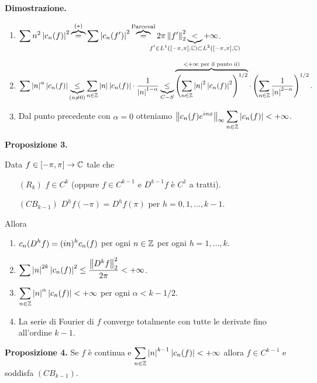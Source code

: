 \textbf{Dimostrazione.}
\begin{enumerate}

\item $\ds \sum n^2 \left| c_n(f) \right|^2 \overbrace{=}^{(\ast)} \sum \left| c_n(f') \right|^2
\overbrace{=}^{\text{Parceval} } 2\pi \norm{f'}_2^2 \underbrace{<}_{\mathclap{f' \in L^1([-\pi,\pi], \C) \subset L^2([-\pi,\pi], \C) }} +\infty$.

\item $\displaystyle \sum \left| n \right|^\alpha \left| c_n(f) \right| 
\underbrace{\leq}_{(n \neq 0)} \sum_{n \in \mathbb Z} \left| n \right| \left| c_n(f) \right| \cdot \frac{1}{\left| n \right|^{1-\alpha }}
\underbrace{\leq}_{C-S} \overbrace{\left( \sum_{n \in \mathbb Z} \left| n \right|^2 \left| c_n(f) \right|^2  \right)^{1/2}}^{< +\infty \text{ per il punto ii)}} \cdot \left( \sum_{n \in \mathbb Z} \frac{1}{\left| n \right|^{2-\alpha }}  \right)^{1/2}. 
$

\item Dal punto precedente con $\alpha = 0$ otteniamo $\displaystyle \left\lVert c_n(f) e^{inx} \right\rVert_\infty \sum_{n \in \mathbb Z} \left| c_n(f) \right| < +\infty $.
\end{enumerate}

\hypertarget{prop:2021-08nov_prop_3}{%
\textbf{Proposizione 3.}} Data $f \in [-\pi,\pi] \to \mathbb C$ tale che
\begin{itemize}
\item[$(R_k)$] $f \in C^k$ (oppure $f \in C^{k-1}$ e $D^{k-1}f$ è $C^1$ a tratti).

\item[$(CB_{k-1})$] $D^h f(-\pi) = D^h f(\pi)$ per $h = 0,1,\ldots, k-1$.
\end{itemize}
Allora
\begin{enumerate}
\item $\displaystyle c_n (D^h f) = (in)^h c_n(f)$ per ogni $n \in \mathbb Z$ per ogni $h = 1,\ldots,k$.

\item $\displaystyle \sum \left| n \right|^{2k} \left| c_n(f) \right|^2 \leq \frac{\left\lVert D^k f \right\rVert_2^2}{2\pi} < +\infty$.

\item $\displaystyle \sum_{n \in \mathbb Z} \left| n \right|^\alpha \left| c_n(f) \right| < +\infty $ per ogni $\alpha < k - 1/2$.

\item La serie di Fourier di $f$ converge totalmente con tutte le derivate fino all'ordine $k-1$.
\end{enumerate}

\textbf{Proposizione 4.} Se $f$ è continua e $\displaystyle \sum_{n \in \mathbb Z} \left| n \right|^{k-1} \left| c_n(f) \right| < +\infty $ allora $f \in C^{k-1}$ e soddisfa $(CB_{k-1})$.

